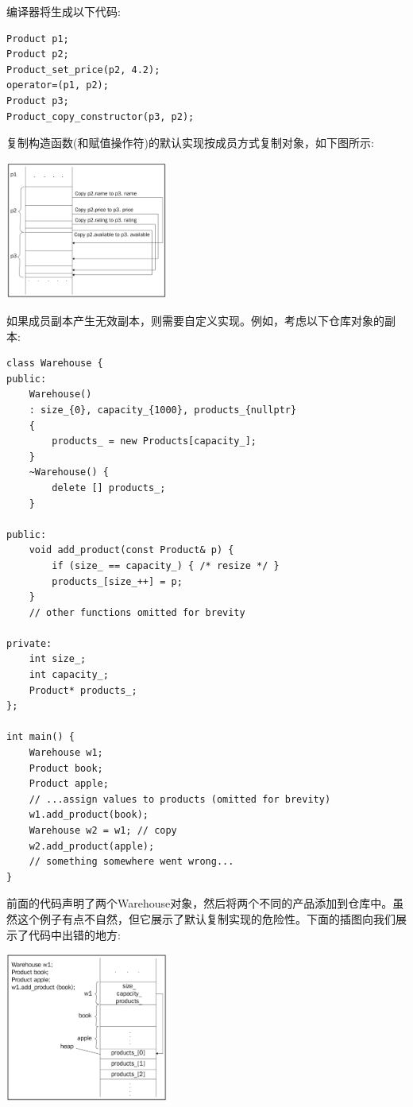 编译器将生成以下代码: \par

\begin{lstlisting}[caption={}]
Product p1;
Product p2;
Product_set_price(p2, 4.2);
operator=(p1, p2);
Product p3;
Product_copy_constructor(p3, p2);
\end{lstlisting}

复制构造函数(和赋值操作符)的默认实现按成员方式复制对象，如下图所示: \par

\begin{center}
	\includegraphics[width=0.4\textwidth]{content/Section-1/Chapter-3/7}
\end{center}

如果成员副本产生无效副本，则需要自定义实现。例如，考虑以下仓库对象的副本: \par

\begin{lstlisting}[caption={}]
class Warehouse {
public:
	Warehouse()
	: size_{0}, capacity_{1000}, products_{nullptr}
	{
		products_ = new Products[capacity_];
	}
	~Warehouse() {
		delete [] products_;
	}

public:
	void add_product(const Product& p) {
		if (size_ == capacity_) { /* resize */ }
		products_[size_++] = p;
	}
	// other functions omitted for brevity
	
private:
	int size_;
	int capacity_;
	Product* products_;
};

int main() {
	Warehouse w1;
	Product book;
	Product apple;
	// ...assign values to products (omitted for brevity)
	w1.add_product(book);
	Warehouse w2 = w1; // copy
	w2.add_product(apple);
	// something somewhere went wrong...
}
\end{lstlisting}

前面的代码声明了两个Warehouse对象，然后将两个不同的产品添加到仓库中。虽然这个例子有点不自然，但它展示了默认复制实现的危险性。下面的插图向我们展示了代码中出错的地方: \par

\begin{center}
	\includegraphics[width=0.4\textwidth]{content/Section-1/Chapter-3/8}
\end{center}

